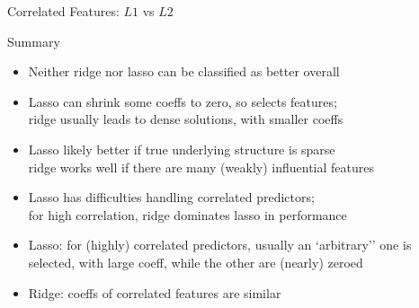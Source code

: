 \documentclass[11pt,compress,t,notes=noshow, xcolor=table]{beamer}
\begin{document}
\begin{vbframe}{Correlated Features: $L1$ vs $L2$}
\framebreak



\end{vbframe}


\begin{vbframe}{Summary  }

\begin{itemize}
\item Neither ridge nor lasso can be classified as better overall
\item Lasso can shrink some coeffs to zero, so selects features; \\
ridge usually leads to dense solutions, with smaller coeffs
\item Lasso likely better if true underlying structure is sparse \\
ridge works well if there are many (weakly) influential features
\item Lasso has difficulties handling correlated predictors; \\
for high correlation, ridge dominates lasso in performance
\item Lasso: for (highly) correlated predictors, usually an `arbitrary'' one is selected, with large 
coeff, while the other are (nearly) zeroed
\item Ridge: coeffs of correlated features are similar
\end{itemize}

\end{vbframe}

\endlecture
\end{document}

